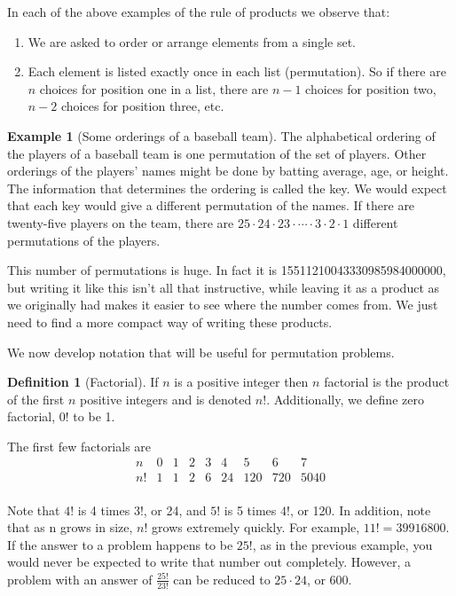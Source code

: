 \documentclass[10pt,]{book}
\theoremstyle{plain}
\theoremstyle{definition}
\newtheorem{definition}[theorem]{Definition}
\theoremstyle{definition}
\newtheorem{example}[theorem]{Example}
\theoremstyle{definition}
\begin{document}
\par
In each of the above examples of the rule of products we observe that:%
\par
\leavevmode%
\begin{enumerate}
\item\hypertarget{li-14}{}We are asked to order or arrange elements from a single set.%
\item\hypertarget{li-15}{}Each element is listed exactly once in each list (permutation). So if there are \(n\) choices for position one in a list, there are \(n - 1\) choices for position two, \(n - 2\) choices for position three, etc.%
\end{enumerate}
%
\begin{example}[Some orderings of a baseball team]\label{some_orderings_of_a_baseball_team}
The alphabetical ordering of the players of a baseball team is one permutation of the set of players. Other orderings of the players' names might be done by batting average, age, or height. The information that determines the ordering is called the key. We would expect that each key would give a different permutation of the names. If there are twenty-five players on the team, there are \(25 \cdot 24 \cdot 23 \cdot \cdots  \cdot 3 \cdot 2 \cdot 1\) different permutations of the players.%
\par
This number of permutations is huge. In fact it is 15511210043330985984000000, but writing it like this isn't all that instructive, while leaving it as a product as we originally had makes it easier to see where the number comes from.  We just need to find a more compact way of writing these products.%
\end{example}
\par

 We now develop notation that will be useful for permutation problems.
%
\begin{definition}[Factorial]\label{Definition-Factorial.}
\label{notation-1}
If \(n\) is a positive integer then \(n\) factorial is the product of the first \(n\) positive integers and is denoted \(n!\). Additionally, we define zero factorial, \(0!\) to be 1.%
\end{definition}
\par
The first few factorials are 
\begin{equation*}
\begin{array}{ccccccccc}
 n & 0 & 1 & 2 & 3 & 4 & 5 & 6 &
   7 \\
  n! & 1 & 1 & 2 & 6 & 24 & 120 &
   720 & 5040 \\
\end{array}
\end{equation*}%
\par
Note that \(4!\) is 4 times \(3!\), or 24, and \(5!\) is 5 times \(4!\), or 120. In addition, note that as n grows in size, \(n!\) grows extremely quickly. For example, \(11! = 39916800\). If the answer to a problem happens to be \(25!\), as in the previous example, you would never be expected to write that number out completely. However, a problem with an answer of \(\frac{25!}{23!}\) can be reduced to \(25 \cdot 24\), or 600.%
\par
\end{document}
